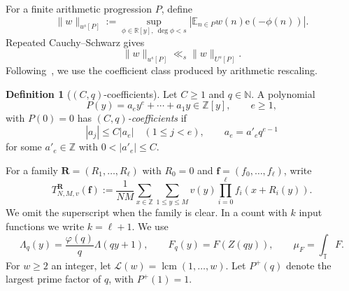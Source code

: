 \documentclass[12pt]{amsart}
\newcommand{\Z}{\mathbb Z}
\newcommand{\1}{\mathbf 1}
\newcommand{\e}{\mathrm e}
\theoremstyle{definition}
\newtheorem{definition}[theorem]{Definition}
\begin{document}
For a finite arithmetic progression \(P\), define
\begin{equation}\label{e:u-def}
 \|w\|_{u^s[P]}:=\sup_{\phi\in\mathbb R[y],\ \deg\phi<s}
 \left|\mathbb E_{n\in P}w(n)\e(-\phi(n))\right|.
\end{equation}
Repeated Cauchy--Schwarz gives
\begin{equation}\label{e:u-below-U}
 \|w\|_{u^s[P]}\ll_s\|w\|_{U^s[P]}.
\end{equation}
Following~\cite[Definition~2.3]{ShaoWang}, we use the coefficient class
produced by arithmetic rescaling.

\begin{definition}[$(C,q)$-coefficients]\label{d:Cq}
Let $C\ge1$ and $q\in\mathbb N$.  A polynomial
\[
 P(y)=a_ey^e+\cdots+a_1y\in\Z[y],\qquad e\ge1,
\]
with $P(0)=0$ has \emph{$(C,q)$-coefficients} if
\[
 |a_j|\le C|a_e|\quad(1\le j<e),
 \qquad a_e=a'_eq^{e-1}
\]
for some $a'_e\in\Z$ with $0<|a'_e|\le C$.
\end{definition}

For a family $\mathbf R=(R_1,\ldots,R_\ell)$ with $R_0=0$ and
$\mathbf f=(f_0,\ldots,f_\ell)$, write
\begin{equation}\label{e:Tdef}
 T_{N,M,v}^{\mathbf R}(\mathbf f)
 :=\frac1{NM}\sum_{x\in\mathbb Z}\sum_{1\le y\le M}
 v(y)\prod_{i=0}^\ell f_i(x+R_i(y)).
\end{equation}
We omit the superscript when the family is clear. In a count with
$k$ input functions we write $k=\ell+1$. We use
\[
 \Lambda_q(y)=\frac{\varphi(q)}q\Lambda(qy+1),\qquad
 F_q(y)=F(Z(qy)),\qquad \mu_F=\int_{\mathbb T}F.
\]
For $w\ge2$ an integer, let $\mathcal L(w)=\operatorname{lcm}(1,\ldots,w)$.
Let $P^+(q)$ denote the largest prime factor of $q$, with $P^+(1)=1$.

\end{document}

